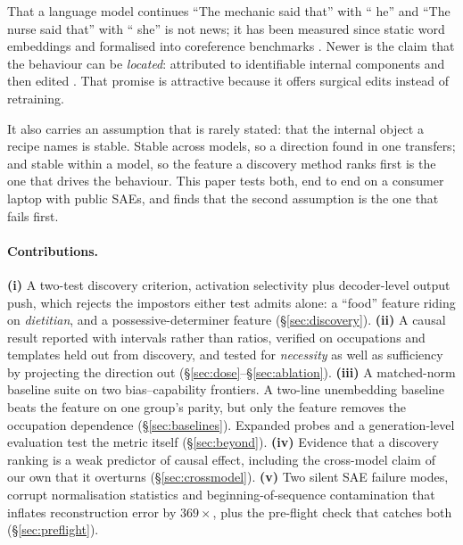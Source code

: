 \documentclass{article}
\begin{document}
That a language model continues ``The mechanic said that'' with `` he'' and ``The nurse
said that'' with `` she'' is not news; it has been measured since static word embeddings
\citep{bolukbasi2016,caliskan2017} and formalised into coreference benchmarks
\citep{rudinger2018,zhao2018}. Newer is the claim that the behaviour can be
\emph{located}: attributed to identifiable internal components and then edited
\citep{vig2020,marks2024}. That promise is attractive because it offers surgical edits
instead of retraining.

It also carries an assumption that is rarely stated: that the internal object a recipe
names is stable. Stable across models, so a direction found in one transfers; and stable
within a model, so the feature a discovery method ranks first is the one that drives the
behaviour. This paper tests both, end to end on a consumer laptop with public SAEs, and
finds that the second assumption is the one that fails first.

\paragraph{Contributions.}
\textbf{(i)} A two-test discovery criterion, activation selectivity plus decoder-level
output push, which rejects the impostors either test admits alone: a
``food'' feature riding on \emph{dietitian}, and a possessive-determiner feature
(\S\ref{sec:discovery}). \textbf{(ii)} A causal result reported with intervals rather
than ratios, verified on occupations and templates held out from discovery, and tested for
\emph{necessity} as well as sufficiency by projecting the direction out
(\S\ref{sec:dose}--\S\ref{sec:ablation}). \textbf{(iii)} A matched-norm baseline suite on
two bias--capability frontiers. A two-line unembedding baseline beats the feature on one
group's parity, but only the feature removes the occupation dependence
(\S\ref{sec:baselines}). Expanded probes and a generation-level evaluation test the metric
itself (\S\ref{sec:beyond}). \textbf{(iv)} Evidence that a discovery ranking is a weak
predictor of causal effect, including the cross-model claim of our own that it overturns
(\S\ref{sec:crossmodel}). \textbf{(v)} Two silent SAE failure modes, corrupt
normalisation statistics and beginning-of-sequence contamination that inflates
reconstruction error by $369\times$, plus the pre-flight check that catches both
(\S\ref{sec:preflight}).
\end{document}
